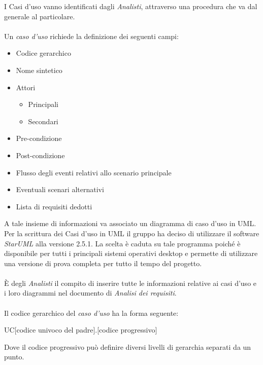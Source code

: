 \documentclass[a4paper]{article}
\begin{document}
			 I Casi d'uso vanno identificati dagli \emph{Analisti}, attraverso una procedura che va dal
			 generale al particolare.
			  \\ \\
			 Un \emph{caso d'uso} richiede la definizione dei seguenti campi:
			 \begin{itemize}
			 	\item Codice gerarchico
			 	\item Nome sintetico
			 	\item Attori
			 	\begin{itemize}
			 		\item Principali
			 		\item Secondari
			 	\end{itemize}
			 	\item Pre-condizione
			 	\item Post-condizione
			 	\item Flusso degli eventi relativi allo scenario principale
			 	\item Eventuali scenari alternativi
			 	\item Lista di requisiti dedotti
			 \end{itemize}
			 A tale insieme di informazioni va associato un diagramma di caso d'uso in UML. Per la
			 scrittura dei Casi d'uso in UML il gruppo ha deciso di utilizzare il software
			  \emph{StarUML} alla versione 2.5.1. La scelta è  caduta su tale programma poiché
			  è disponibile per tutti i principali sistemi operativi desktop e permette di
			   utilizzare una versione di prova completa per tutto il tempo del progetto.
			  \\ \\
			  È degli \emph{Analisti} il compito di inserire tutte le informazioni relative ai casi
			  d'uso e i loro diagrammi nel documento di \emph{Analisi dei requisiti}.
			  \\ \\
			 Il codice gerarchico del \emph{caso d'uso} ha la forma seguente:
			 \begin{center}
			 	UC[codice univoco del padre].[codice progressivo]
			 \end{center}
			 Dove il codice progressivo può definire diversi livelli di gerarchia separati da un punto.
\end{document}
